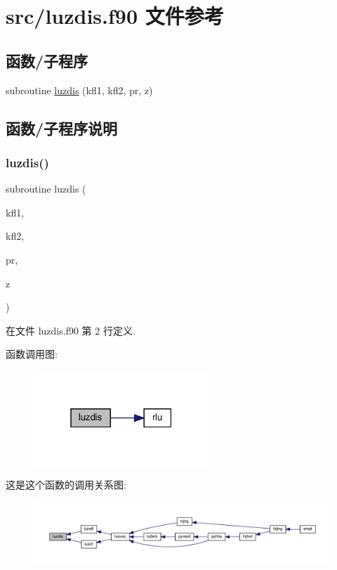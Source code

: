 \hypertarget{luzdis_8f90}{}\section{src/luzdis.f90 文件参考}
\label{luzdis_8f90}
\subsection*{函数/子程序}
\begin{DoxyCompactItemize}
\item 
subroutine \mbox{\hyperlink{luzdis_8f90_a29281a3a208fc2618f9f3770fe1892d7}{luzdis}} (kfl1, kfl2, pr, z)
\end{DoxyCompactItemize}


\subsection{函数/子程序说明}
\mbox{\label{luzdis_8f90_a29281a3a208fc2618f9f3770fe1892d7}} 
\subsubsection{\texorpdfstring{luzdis()}{luzdis()}}
{\footnotesize\ttfamily subroutine luzdis (\begin{DoxyParamCaption}\item[{}]{kfl1,  }\item[{}]{kfl2,  }\item[{}]{pr,  }\item[{}]{z }\end{DoxyParamCaption})}



在文件 luzdis.\+f90 第 2 行定义.

函数调用图\+:
\nopagebreak
\begin{figure}[H]
\begin{center}
\leavevmode
\includegraphics[width=187pt]{luzdis_8f90_a29281a3a208fc2618f9f3770fe1892d7_cgraph}
\end{center}
\end{figure}
这是这个函数的调用关系图\+:
\nopagebreak
\begin{figure}[H]
\begin{center}
\leavevmode
\includegraphics[width=350pt]{luzdis_8f90_a29281a3a208fc2618f9f3770fe1892d7_icgraph}
\end{center}
\end{figure}
